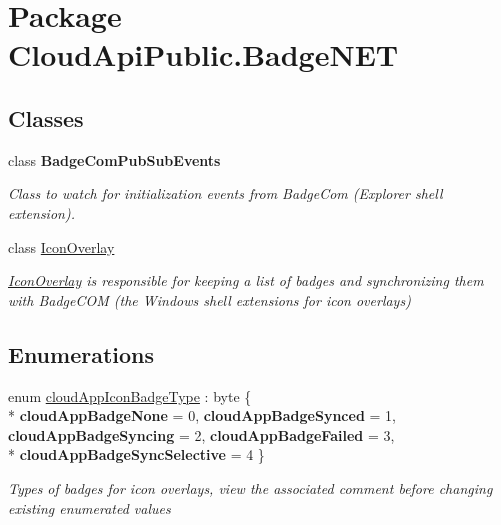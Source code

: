 \hypertarget{namespace_cloud_api_public_1_1_badge_n_e_t}{\section{Package Cloud\-Api\-Public.\-Badge\-N\-E\-T}
\label{namespace_cloud_api_public_1_1_badge_n_e_t}
}
\subsection*{Classes}
\begin{DoxyCompactItemize}
\item 
class {\bfseries Badge\-Com\-Pub\-Sub\-Events}
\begin{DoxyCompactList}\small\item\em Class to watch for initialization events from Badge\-Com (Explorer shell extension). \end{DoxyCompactList}\item 
class \hyperlink{class_cloud_api_public_1_1_badge_n_e_t_1_1_icon_overlay}{Icon\-Overlay}
\begin{DoxyCompactList}\small\item\em \hyperlink{class_cloud_api_public_1_1_badge_n_e_t_1_1_icon_overlay}{Icon\-Overlay} is responsible for keeping a list of badges and synchronizing them with Badge\-C\-O\-M (the Windows shell extensions for icon overlays) \end{DoxyCompactList}\end{DoxyCompactItemize}
\subsection*{Enumerations}
\begin{DoxyCompactItemize}
\item 
enum \hyperlink{namespace_cloud_api_public_1_1_badge_n_e_t_afab91a750338fef6bd4ef08f5381c4e4}{cloud\-App\-Icon\-Badge\-Type} \-: byte \{ \\*
{\bfseries cloud\-App\-Badge\-None} = 0, 
{\bfseries cloud\-App\-Badge\-Synced} = 1, 
{\bfseries cloud\-App\-Badge\-Syncing} = 2, 
{\bfseries cloud\-App\-Badge\-Failed} = 3, 
\\*
{\bfseries cloud\-App\-Badge\-Sync\-Selective} = 4
 \}
\begin{DoxyCompactList}\small\item\em Types of badges for icon overlays, view the associated comment before changing existing enumerated values \end{DoxyCompactList}\end{DoxyCompactItemize}


